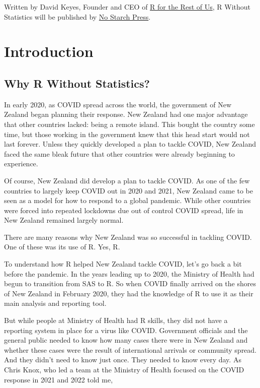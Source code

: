 \documentclass[
]{book}
\begin{document}
Written by David Keyes, Founder and CEO of \href{https://rfortherestofus.com/}{R for the Rest of Us}, R Without Statistics will be published by \href{https://nostarch.com/}{No Starch Press}.

\hypertarget{part-introduction}{%
\part*{Introduction}\label{part-introduction}}

\hypertarget{why-r-without-statistics}{%
\chapter{Why R Without Statistics?}\label{why-r-without-statistics}}

In early 2020, as COVID spread across the world, the government of New Zealand began planning their response. New Zealand had one major advantage that other countries lacked: being a remote island. This bought the country some time, but those working in the government knew that this head start would not last forever. Unless they quickly developed a plan to tackle COVID, New Zealand faced the same bleak future that other countries were already beginning to experience.

Of course, New Zealand did develop a plan to tackle COVID. As one of the few countries to largely keep COVID out in 2020 and 2021, New Zealand came to be seen as a model for how to respond to a global pandemic. While other countries were forced into repeated lockdowns due out of control COVID spread, life in New Zealand remained largely normal.

There are many reasons why New Zealand was so successful in tackling COVID. One of these was its use of R. Yes, R.

To understand how R helped New Zealand tackle COVID, let's go back a bit before the pandemic. In the years leading up to 2020, the Ministry of Health had begun to transition from SAS to R. So when COVID finally arrived on the shores of New Zealand in February 2020, they had the knowledge of R to use it as their main analysis and reporting tool.

But while people at Ministry of Health had R skills, they did not have a reporting system in place for a virus like COVID. Government officials and the general public needed to know how many cases there were in New Zealand and whether these cases were the result of international arrivals or community spread. And they didn't need to know just once. They needed to know every day. As Chris Knox, who led a team at the Ministry of Health focused on the COVID response in 2021 and 2022 told me,
\end{document}
